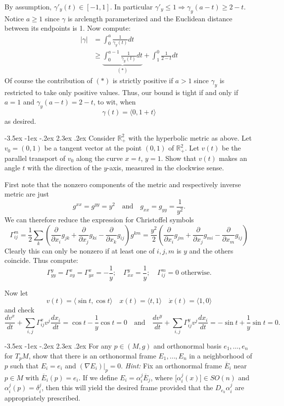 \documentclass[10pt]{article}
\makeatletter
\renewcommand\section{\@startsection{section}{1}{\z@}%
                                  {-3.5ex \@plus -1ex \@minus -.2ex}%
                                  {2.3ex \@plus.2ex}%
                                  {\normalfont\large\bfseries}}
\newcommand{\R}{{\ensuremath{\mathbb{R}}} }
\newcommand{\del}{{\ensuremath{\partial}} }
\newcommand{\xt}[2]{\ensuremath{\Gamma^{#1}_{#2}}}
\newcommand{\hint}[1]{{\emph{Hint:} #1}} %
\makeatother
\begin{document}
By assumption, $\gamma'_y(t) \in [-1,1]$. In particular $\gamma'_y \leq 1 \Rightarrow \gamma_y(a-t) \geq 2 -t$. 
Notice $a \geq 1$ since $\gamma$ is arclength parameterized and the Euclidean distance between its endpoints is 1.
 Now compute:
\begin{align*}|\gamma| &=  \int_0^a \frac{1}{ \gamma_y(t)} dt \\ 
&\geq \underbrace{\int_0^{a-1} \frac{1}{\gamma_y(t)} dt}_{(*)} + \int_1^0 \frac{1}{ 2-t} dt  \end{align*}
Of course the contribution of $(*)$ is strictly positive if $a >1$ since $\gamma_y$ is restricted to take only
 positive values. Thus, our bound is tight if and only if $a = 1$ and $\gamma_y(a-t) = 2- t$, to wit, when
\[\gamma(t) =  \langle 0, 1 +t \rangle\]
as desired.

\section{Consider $\R_+^2$ with the hyperbolic metric as above. Let $v_0 = (0,1)$ be a tangent vector at the point $(0,1)$ of $\R_+^2$. Let $v(t)$ be the parallel transport of $v_0$ along the curve $x=t$, $y=1$. Show that $v(t)$ makes an angle $t$ with the direction of the $y$-axis, measured in the clockwise sense.}

First note that the nonzero components of the metric and respectively inverse metric are just
\[ g^{xx} = g^{yy} = y^2 \quad \mbox{and} \quad g_{xx} = g_{yy} = \frac{1}{y^2}.\]
We can therefore reduce the expression for Christoffel symbols
\[ \xt{m}{ij} = \frac{1}{2} \sum_k \left( \frac{\del}{\del x_i } g_{jk} + \frac{\del}{\del x_j}g_{ki} - \frac{\del}{\del x_k} g_{ij} \right) g^{km} = \frac{y^2}{2}  \left( \frac{\del}{\del x_i } g_{jm} + \frac{\del}{\del x_j}g_{mi} - \frac{\del}{\del x_m} g_{ij} \right)\]
Clearly this can only be nonzero if at least one of $i,j,m$ is $y$ and the others coincide. Thus compute:
\[\xt{y}{yy} =\xt{x}{xy} =\xt{x}{yx} = - \frac{1}{y}; \quad \xt{y}{xx} = \frac{1}{y}; \quad \xt{m}{ij} = 0   \mbox{ otherwise} .\]

Now let 
\[v(t) = \langle \sin t, \cos t \rangle \quad x(t) = \langle t, 1 \rangle \quad \dot{x}(t) =\langle 1 , 0 \rangle \]
and check
\[\frac{dv^x}{dt } + \sum_{i,j} \xt{x}{ij} v^j \frac{dx_i}{dt} = \cos t - \frac{1}{y} \cos t = 0 \quad \mbox{and} \quad\frac{dv^y}{dt } + \sum_{i,j} \xt{y}{ij} v^j \frac{dx_i}{dt} = - \sin t + \frac{1}{y} \sin t=0.\]

\section{For any $p \in (M,g)$ and orthonormal basis $e_1, \dots, e_n$ for $T_p M$, show that there is an orthonormal frame $E_1, \dots, E_n$ in a neighborhood of $p$ such that $E_i = e_i$ and $(\nabla E_i)|_p = 0 $. \hint{Fix an orthonormal frame $\overline{E}_i$ near $p \in M$ with $\overline{E}_i(p) = e_i$. If we define $E_i = \alpha_i^j \overline{E}_j$, where [$\alpha_i^j (x)$]$\in SO(n)$ and $\alpha_i^j(p) = \delta_i^j$, then this will yield the desired frame provided that the $D_{e_k} \alpha_i^j$ are appropriately prescribed. }}
\end{document}
